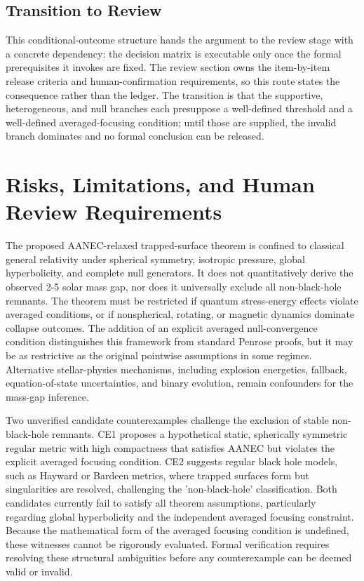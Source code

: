 \documentclass[conference]{IEEEtran}
\begin{document}
\subsection{Transition to Review}
This conditional-outcome structure hands the argument to the review stage with a concrete dependency: the decision matrix is executable only once the formal prerequisites it invokes are fixed. The review section owns the item-by-item release criteria and human-confirmation requirements, so this route states the consequence rather than the ledger. The transition is that the supportive, heterogeneous, and null branches each presuppose a well-defined threshold and a well-defined averaged-focusing condition; until those are supplied, the invalid branch dominates and no formal conclusion can be released.

\section{Risks, Limitations, and Human Review Requirements}
The proposed AANEC-relaxed trapped-surface theorem is confined to classical general relativity under spherical symmetry, isotropic pressure, global hyperbolicity, and complete null generators. It does not quantitatively derive the observed 2-5 solar mass gap, nor does it universally exclude all non-black-hole remnants. The theorem must be restricted if quantum stress-energy effects violate averaged conditions, or if nonspherical, rotating, or magnetic dynamics dominate collapse outcomes. The addition of an explicit averaged null-convergence condition distinguishes this framework from standard Penrose proofs, but it may be as restrictive as the original pointwise assumptions in some regimes. Alternative stellar-physics mechanisms, including explosion energetics, fallback, equation-of-state uncertainties, and binary evolution, remain confounders for the mass-gap inference.~\cite{cite_0ed84243cf171bc4}

Two unverified candidate counterexamples challenge the exclusion of stable non-black-hole remnants. CE1 proposes a hypothetical static, spherically symmetric regular metric with high compactness that satisfies AANEC but violates the explicit averaged focusing condition. CE2 suggests regular black hole models, such as Hayward or Bardeen metrics, where trapped surfaces form but singularities are resolved, challenging the 'non-black-hole' classification. Both candidates currently fail to satisfy all theorem assumptions, particularly regarding global hyperbolicity and the independent averaged focusing constraint. Because the mathematical form of the averaged focusing condition is undefined, these witnesses cannot be rigorously evaluated. Formal verification requires resolving these structural ambiguities before any counterexample can be deemed valid or invalid.
\end{document}
